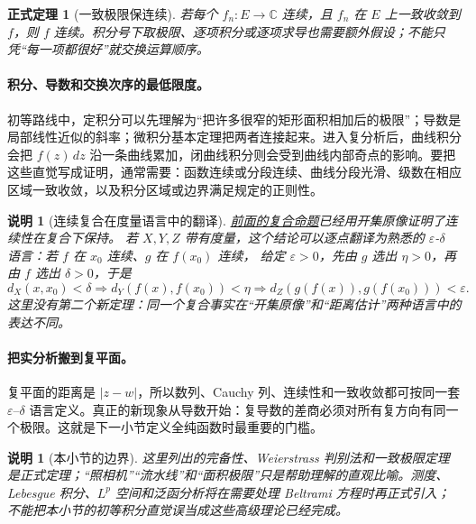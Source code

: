 \documentclass[UTF8,fontset=none,a4paper,11pt]{ctexart}
\theoremstyle{foundation-definition}
\theoremstyle{foundation-theorem}
\newtheorem{theorem}[definition]{正式定理}
\theoremstyle{foundation-proposition}
\theoremstyle{foundation-example}
\theoremstyle{foundation-remark}
\newtheorem{remark}[definition]{说明}
\theoremstyle{foundation-theorem}
\newcommand{\term}[2]{\hyperref[#1]{#2}}
\begin{document}
\begin{theorem}[一致极限保连续]
若每个 \(f_n:E\to\mathbb C\) 连续，且 \(f_n\) 在 \(E\) 上一致收敛到 \(f\)，则 \(f\) 连续。积分号下取极限、逐项积分或逐项求导也需要额外假设；不能只凭“每一项都很好”就交换运算顺序。
\end{theorem}

\paragraph{积分、导数和交换次序的最低限度。}
初等路线中，定积分可以先理解为“把许多很窄的矩形面积相加后的极限”；导数是局部线性近似的斜率；微积分基本定理把两者连接起来。进入复分析后，曲线积分会把 \(f(z)\,dz\) 沿一条曲线累加，闭曲线积分则会受到曲线内部奇点的影响。要把这些直觉写成证明，通常需要：函数连续或分段连续、曲线分段光滑、级数在相应区域一致收敛，以及积分区域或边界满足规定的正则性。

\begin{remark}[连续复合在度量语言中的翻译]
\term{prop:continuous-composition}{前面的复合命题}已经用开集原像证明了连续性在复合下保持。
若 \(X,Y,Z\) 带有度量，这个结论可以逐点翻译为熟悉的
\(\varepsilon\)-\(\delta\) 语言：若 \(f\) 在 \(x_0\) 连续、\(g\) 在 \(f(x_0)\) 连续，
给定 \(\varepsilon>0\)，先由 \(g\) 选出 \(\eta>0\)，再由 \(f\) 选出
\(\delta>0\)，于是
\[
d_X(x,x_0)<\delta
\Longrightarrow d_Y(f(x),f(x_0))<\eta
\Longrightarrow d_Z(g(f(x)),g(f(x_0)))<\varepsilon.
\]
这里没有第二个新定理：同一个复合事实在“开集原像”和“距离估计”两种语言中的表达不同。
\end{remark}

\paragraph{把实分析搬到复平面。}
复平面的距离是 \(|z-w|\)，所以数列、Cauchy 列、连续性和一致收敛都可按同一套 \(\varepsilon\)--\(\delta\) 语言定义。真正的新现象从导数开始：复导数的差商必须对所有复方向有同一个极限。这就是下一小节定义全纯函数时最重要的门槛。

\begin{remark}[本小节的边界]
这里列出的完备性、Weierstrass 判别法和一致极限定理是正式定理；“照相机”“流水线”和“面积极限”只是帮助理解的直观比喻。测度、Lebesgue 积分、\(L^p\) 空间和泛函分析将在需要处理 Beltrami 方程时再正式引入；不能把本小节的初等积分直觉误当成这些高级理论已经完成。
\end{remark}
\end{document}

